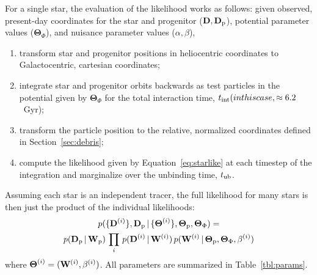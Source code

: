 \documentclass{emulateapj}
\newcommand{\given}{\,|\,}
\newcommand{\D}{{\bf D}}
\newcommand{\W}{{\bf W}}
\newcommand{\bs}{\boldsymbol}
\newcommand{\sat}{{\rm p}}
\newcommand{\tub}{t_{\rm ub}}
\newcommand{\tailbit}{\beta}
\newcommand{\Loffset}{\alpha}
\begin{document}
For a single star, the evaluation of the likelihood works as follows: given observed, present-day coordinates for the star and progenitor ($\D,\D_\sat$), potential parameter values ($\bs{\Theta}_\Phi$), and nuisance parameter values ($\Loffset,\tailbit$),
\begin{enumerate}
	\item transform star and progenitor positions in heliocentric coordinates to Galactocentric, cartesian coordinates;
	\item integrate star and progenitor orbits backwards as test particles in the potential given by $\bs{\Theta}_\Phi$ for the total interaction time, $t_{\rm int} (in this case, \approx6.2$~Gyr);
	\item transform the particle position to the relative, normalized coordinates defined in Section~\ref{sec:debris};
	\item compute the likelihood given by Equation~\ref{eq:starlike} at each timestep of the integration and marginalize over the unbinding time, $\tub$.
\end{enumerate}

Assuming each star is an independent tracer, the full likelihood for many stars is then just the product of the individual likelihoods:
\begin{multline}
	p(\{\D^{(i)}\}, \D_\sat \given \{\bs{\Theta}^{(i)}\}, \bs{\Theta}_\sat, \bs{\Theta}_\Phi ) = \\
		p(\D_\sat \given \W_\sat) \, \prod_i \, p(\D^{(i)} \given \W^{(i)}) \,
			p(\W^{(i)} \given \bs{\Theta}_\sat, \bs{\Theta}_\Phi, \tailbit^{(i)})
\end{multline}
where $\bs{\Theta}^{(i)} = (\W^{(i)}, \tailbit^{(i)})$. All parameters are summarized in Table~\ref{tbl:params}.
\end{document}
